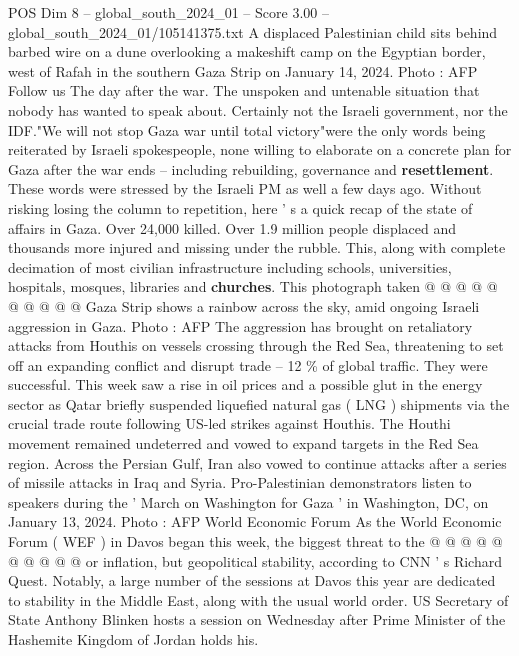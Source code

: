 \begin{textsample}{POS Dim 8 – global\_south\_2024\_01 – Score 3.00 – global\_south\_2024\_01/105141375.txt}  \label{ex:f8_pos_395}
A displaced Palestinian child sits behind barbed wire on a dune overlooking a makeshift camp on the Egyptian border, west of Rafah in the southern Gaza Strip on January 14, 2024.
Photo : AFP Follow us The day after the war.
The unspoken and untenable situation that nobody has wanted to speak about.
Certainly not the Israeli government, nor the IDF."We will not stop Gaza war until total victory"were the only words being reiterated by Israeli spokespeople, none willing to elaborate on a concrete plan for Gaza after the war ends -- including rebuilding, governance and \textbf{resettlement}.
These words were stressed by the Israeli PM as well a few days ago.
Without risking losing the column to repetition, here ' s a quick recap of the state of affairs in Gaza.
Over 24,000 killed.
Over 1.9 million people displaced and thousands more injured and missing under the rubble.
This, along with complete decimation of most civilian infrastructure including schools, universities, hospitals, mosques, libraries and \textbf{churches}.
This photograph taken @ @ @ @ @ @ @ @ @ @ Gaza Strip shows a rainbow across the sky, amid ongoing Israeli aggression in Gaza.
Photo : AFP The aggression has brought on retaliatory attacks from Houthis on vessels crossing through the Red Sea, threatening to set off an expanding conflict and disrupt trade -- 12 \% of global traffic.
They were successful.
This week saw a rise in oil prices and a possible glut in the energy sector as Qatar briefly suspended liquefied natural gas ( LNG ) shipments via the crucial trade route following US-led strikes against Houthis.
The Houthi movement remained undeterred and vowed to expand targets in the Red Sea region.
Across the Persian Gulf, Iran also vowed to continue attacks after a series of missile attacks in Iraq and Syria.
Pro-Palestinian demonstrators listen to speakers during the ' March on Washington for Gaza ' in Washington, DC, on January 13, 2024.
Photo : AFP World Economic Forum As the World Economic Forum ( WEF ) in Davos began this week, the biggest threat to the @ @ @ @ @ @ @ @ @ @ or inflation, but geopolitical stability, according to CNN ' s Richard Quest.
Notably, a large number of the sessions at Davos this year are dedicated to stability in the Middle East, along with the usual world order.
US Secretary of State Anthony Blinken hosts a session on Wednesday after Prime Minister of the Hashemite Kingdom of Jordan holds his.

\end{textsample}
